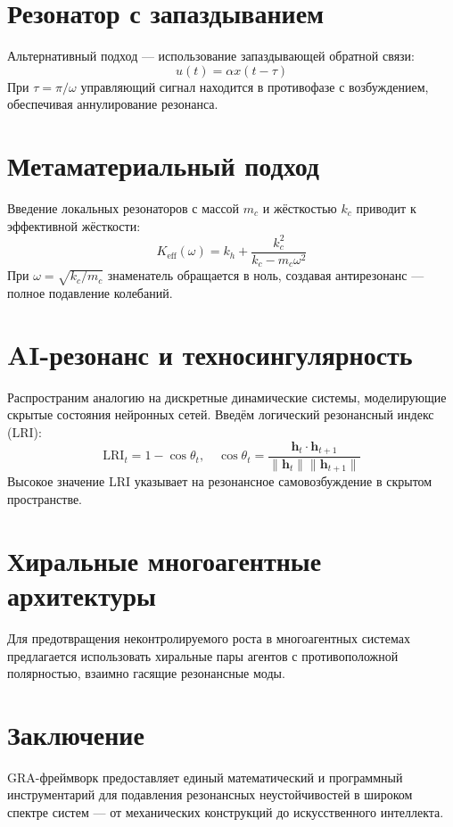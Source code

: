 \documentclass[a4paper,12pt]{article}
\begin{document}
\section{Резонатор с запаздыванием}
Альтернативный подход — использование запаздывающей обратной связи:
\begin{equation}
u(t) = \alpha x(t - \tau)
\end{equation}
При $\tau = \pi/\omega$ управляющий сигнал находится в противофазе с возбуждением, обеспечивая аннулирование резонанса.

\section{Метаматериальный подход}
Введение локальных резонаторов с массой $m_c$ и жёсткостью $k_c$ приводит к эффективной жёсткости:
\begin{equation}
K_{\text{eff}}(\omega) = k_h + \frac{k_c^2}{k_c - m_c \omega^2}
\end{equation}
При $\omega = \sqrt{k_c/m_c}$ знаменатель обращается в ноль, создавая антирезонанс — полное подавление колебаний.

\section{AI-резонанс и техносингулярность}
Распространим аналогию на дискретные динамические системы, моделирующие скрытые состояния нейронных сетей. Введём логический резонансный индекс (LRI):
\begin{equation}
\text{LRI}_t = 1 - \cos\theta_t, \quad \cos\theta_t = \frac{\mathbf{h}_t \cdot \mathbf{h}_{t+1}}{\|\mathbf{h}_t\| \|\mathbf{h}_{t+1}\|}
\end{equation}
Высокое значение LRI указывает на резонансное самовозбуждение в скрытом пространстве.

\section{Хиральные многоагентные архитектуры}
Для предотвращения неконтролируемого роста в многоагентных системах предлагается использовать хиральные пары агентов с противоположной полярностью, взаимно гасящие резонансные моды.

\section{Заключение}
GRA-фреймворк предоставляет единый математический и программный инструментарий для подавления резонансных неустойчивостей в широком спектре систем — от механических конструкций до искусственного интеллекта.
\end{document}
